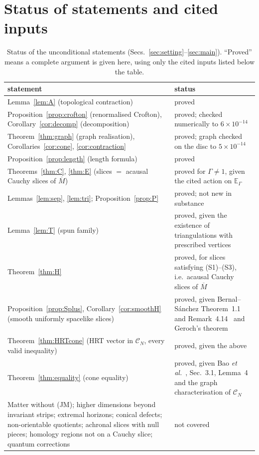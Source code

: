 \documentclass[aps,prd,onecolumn,superscriptaddress,nofootinbib,amsmath,amssymb,11pt]{revtex4-2}
\theoremstyle{definition}
\newcommand{\CN}{\mathcal{C}_N}
\newcommand{\Mbar}{\overline{M}}
\newcommand{\EG}{\mathbb{E}_\Gamma}
\begin{document}
\section{Status of statements and cited inputs}\label{sec:status}

\begin{table}[h]
\caption{Status of the unconditional statements (Secs.~\ref{sec:setting}--\ref{sec:main}). ``Proved'' means a complete argument is given here, using only the cited inputs listed below
the table.}
\label{tab:status}
\begin{ruledtabular}
\begin{tabular}{p{}p{}}
statement & status\\
\hline
Lemma~\ref{lem:A} (topological contraction) & proved\\
Proposition~\ref{prop:crofton} (renormalised Crofton), Corollary~\ref{cor:decomp} (decomposition) & proved; checked numerically to $6\times10^{-14}$\\
Theorem~\ref{thm:graph} (graph realisation), Corollaries~\ref{cor:cone}, \ref{cor:contraction} & proved; graph checked on the disc to $5\times10^{-14}$\\
Proposition~\ref{prop:length} (length formula) & proved\\
Theorems~\ref{thm:C}, \ref{thm:E} (slices $=$ acausal Cauchy slices of $\Mbar$) & proved for $\Gamma\ne1$, given the cited action on $\EG$\\
Lemmas~\ref{lem:sep}, \ref{lem:tri}; Proposition~\ref{prop:P} & proved; not new in substance~\cite{MazzoliViaggi2022}\\
Lemma~\ref{lem:T} (spun family) & proved, given the existence of triangulations with prescribed vertices~\cite{Hatcher1991}\\
Theorem~\ref{thm:H} & proved, for slices satisfying (S1)--(S3), i.e.\ acausal Cauchy slices of $\Mbar$\\
Proposition~\ref{prop:Splus}, Corollary~\ref{cor:smoothH} (smooth uniformly spacelike slices) & proved, given Bernal--S\'anchez Theorem~1.1 and Remark~4.14~\cite{BernalSanchez2006} and Geroch's theorem\\
Theorem~\ref{thm:HRTcone} (HRT vector in $\CN$, every valid inequality) & proved, given the above\\
Theorem~\ref{thm:equality} (cone equality) & proved, given Bao \emph{et al.}~\cite{Bao2015}, Sec.~3.1, Lemma~4 and the graph characterisation of $\CN$\\
Matter without (JM); higher dimensions beyond invariant strips; extremal horizons; conical defects; non-orientable quotients; achronal slices with null pieces; homology regions not on a Cauchy slice; quantum corrections & not covered\\
\end{tabular}
\end{ruledtabular}
\end{table}
\end{document}
